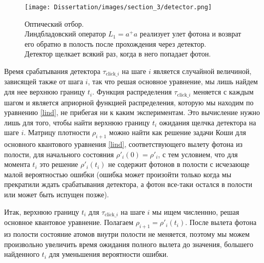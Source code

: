 \begin{figure}[bt]
	\noindent\centering\texttt{[image: Dissertation/images/section\_3/detector.png]}
	\captionsetup{format=hang,width=0.85\textwidth,justification=centering,singlelinecheck=no}
	\caption{Оптический отбор.\\Линдбладовский оператор $L_{1} = a^{+}a$ реализует улет фотона и возврат его обратно в полость после прохождения через детектор.\\ Детектор щелкает всякий раз, когда в него попадает фотон.}
	\label{fig:2}
\end{figure}

Время срабатывания детектора $\tau_{\text{click}\_i}$ на шаге $i$ является случайной величиной, зависящей также от шага $i$, так что решая основное уравнение, мы лишь найдем для нее верхнюю границу $t_i$. Функция распределения $\tau_{\text{click}\_i}$ меняется с каждым шагом и является априорной функцией распределения, которую мы находим по уравнению \eqref{lind}, не прибегая ни к каким экспериментам. Это вычисление нужно лишь для того, чтобы найти верхнюю границу $t_i$ ожидания щелчка детектора на шаге $i$. Матрицу плотности $\rho_{i+1}$ можно найти как решение задачи Коши для основного квантового уравнения \eqref{lind}, соответствующего вылету фотона из полости, для начального состояния $\rho'_i(0)=\rho'_i$, с тем условием, что для момента $t_{i}$ это решение $\rho'_i(t_{i})$ не содержит фотонов в полости с исчезающе малой вероятностью ошибки  (ошибка может произойти только когда мы прекратили ждать срабатывания детектора, а фотон все-таки остался в полости или может быть испущен позже).

Итак, верхнюю границу $t_i$ для $\tau_{\text{click}\_i}$ на шаге $i$ мы ищем численнно, решая основное квантовое уравнение. Полагаем $\rho_{i+1}=\rho'_i(t_{i})$. После вылета фотона из полости состояние атомов внутри полости не меняется, поэтому мы можем произвольно увеличить время ожидания полного вылета до значения, большего найденного $t_i$ для уменьшения вероятности ошибки.

